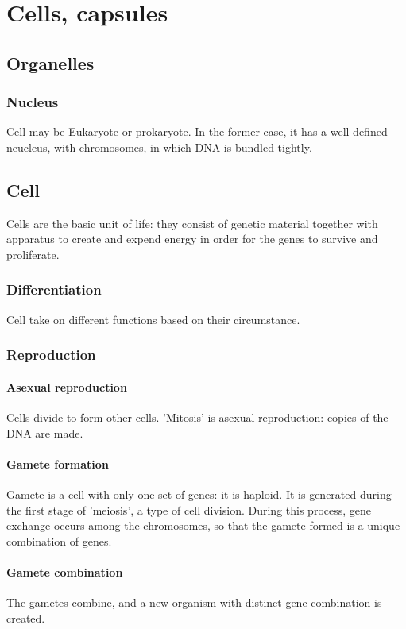 \documentclass[oneside, article]{memoir}
\begin{document}
\chapter{Cells, capsules}
\section{Organelles}
\subsection{Nucleus}
Cell may be Eukaryote or prokaryote. In the former case, it has a well defined neucleus, with chromosomes, in which DNA is bundled tightly.


\section{Cell}
Cells are the basic unit of life: they consist of genetic material together with apparatus to create and expend energy in order for the genes to survive and proliferate. 

\subsection{Differentiation}
Cell take on different functions based on their circumstance.

\subsection{Reproduction}
\subsubsection{Asexual reproduction}
Cells divide to form other cells. 'Mitosis' is asexual reproduction: copies of the DNA are made.

\subsubsection{Gamete formation}
Gamete is a cell with only one set of genes: it is haploid. It is generated during the first stage of 'meiosis', a type of cell division. During this process, gene exchange occurs among the chromosomes, so that the gamete formed is a unique combination of genes.

\subsubsection{Gamete combination}
The gametes combine, and a new organism with distinct gene-combination is created.
\end{document}
